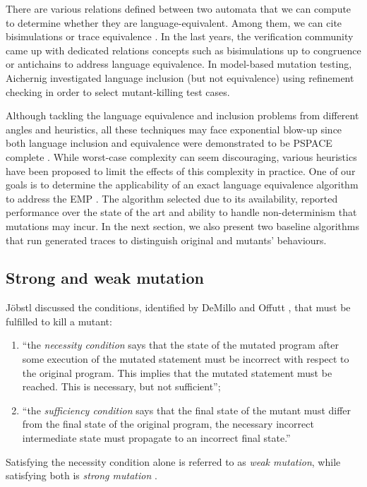 There are various relations defined between two automata that we can compute to determine whether they are language-equivalent. Among them, we can cite bisimulations or trace equivalence \cite{Baier2008}. In the last years, the verification community came up  with dedicated relations concepts such as bisimulations up to congruence \cite{Bonchi2013} or antichains \cite{Doyen2010} to address language equivalence.  In model-based mutation testing, Aichernig \etal investigated  language inclusion (but not equivalence) using refinement checking \cite{Aichernig2015} in order to select mutant-killing test cases.  

Although tackling the language equivalence and inclusion problems from different angles and heuristics, all these techniques may face exponential blow-up since both language inclusion and equivalence were demonstrated to be PSPACE complete \cite{Kupferman1996}. While worst-case complexity can seem discouraging, various heuristics have been proposed to limit the effects of this complexity in practice.  One of our goals is to determine the applicability of an exact language equivalence algorithm to address the EMP \cite{Bonchi2013}. The algorithm selected due to its availability, reported performance over the state of the art and ability to handle non-determinism that mutations may incur. In the next section, we also present two baseline algorithms that run generated traces to distinguish original and mutants' behaviours.

\subsection{Strong and weak mutation}

J{\"o}bstl \cite{Jobstl2014} discussed the conditions, identified by DeMillo and Offutt \cite{DeMillo1993}, that must be fulfilled to kill a mutant:
\begin{enumerate}
\item ``the \emph{necessity condition} says that the state of the mutated program after some execution of the mutated statement must be incorrect with respect to the original program. This implies that the mutated statement must be reached. This is necessary, but not sufficient'';
\item ``the \emph{sufficiency condition} says that the final state of the mutant must differ from the final state of the original program, \ie the necessary incorrect intermediate state must propagate to an incorrect final state.''
\end{enumerate}
Satisfying the necessity condition  alone is referred to as \emph{weak mutation}, while satisfying both is \emph{strong mutation} \cite{Howden1982,Mathur2008}. 

